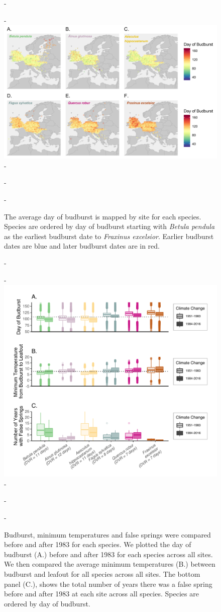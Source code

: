 \documentclass{article}\usepackage[]{graphicx}\usepackage[]{color}
\begin{document}
{\begin{figure} [H]
  -\begin{center}
  -\includegraphics[width=14cm]{..//figures/BB_dvr.png}
  -\caption{The average day of budburst is mapped by site for each species. Species are ordered by day of budburst starting with \textit{Betula pendula} as the earliest budburst date to \textit{Fraxinus excelsior}. Earlier budburst dates are blue and later budburst dates are in red. }\label{fig:bbmap}
  -\end{center}
  -\end{figure}}
  
{\begin{figure} [H]
  -\begin{center}
  -\includegraphics[width=12cm]{..//figures/Boxplot_BBTminFS_dvr.pdf}
  -\caption{Budburst, minimum temperatures and false springs were compared before and after 1983 for each species. We plotted the day of budburst (A.) before and after 1983 for each species across all sites. We then compared the average minimum temperatures (B.) between budburst and leafout for all species across all sites. The bottom panel (C.), shows the total number of years there was a false spring before and after 1983 at each site across all species. Species are ordered by day of budburst.  }\label{fig:boxfs}
  -\end{center}
  -\end{figure}}
  
\end{document}
